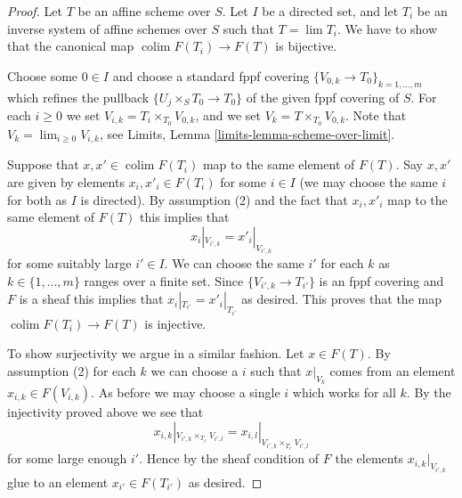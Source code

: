 \documentclass{stacks-project}
\theoremstyle{plain}
\theoremstyle{definition}
\theoremstyle{remark}
\numberwithin{equation}{subsection}
\def\lim{\mathop{\mathrm{lim}}\nolimits}
\def\colim{\mathop{\mathrm{colim}}\nolimits}
\begin{document}
\begin{proof}
Let $T$ be an affine scheme over $S$.
Let $I$ be a directed set, and let
$T_i$ be an inverse system of affine schemes over $S$ such that
$T = \lim T_i$. We have to show that the canonical
map $\colim F(T_i) \to F(T)$ is bijective.

\medskip\noindent
Choose some $0 \in I$ and choose a standard fppf covering
$\{V_{0, k} \to T_{0}\}_{k = 1, \ldots, m}$ which refines
the pullback $\{U_j \times_S T_0 \to T_0\}$ of the given fppf covering of $S$.
For each $i \geq 0$ we set $V_{i, k} = T_i \times_{T_0} V_{0, k}$, and
we set $V_k = T \times_{T_0} V_{0, k}$. Note that
$V_k = \lim_{i \geq 0} V_{i, k}$, see
Limits, Lemma \ref{limits-lemma-scheme-over-limit}.

\medskip\noindent
Suppose that $x, x' \in \colim F(T_i)$ map to the same
element of $F(T)$. Say $x, x'$ are given by elements $x_i, x'_i \in F(T_i)$
for some $i \in I$ (we may choose the same $i$ for both as $I$ is directed).
By assumption (2) and the fact that $x_i, x'_i$ map to the same element
of $F(T)$ this implies that
$$
x_i|_{V_{i', k}} = x'_i|_{V_{i', k}}
$$
for some suitably large $i' \in I$. We can choose the same $i'$ for each
$k$ as $k \in \{1, \ldots, m\}$ ranges over a finite set.
Since $\{V_{i', k} \to T_{i'}\}$
is an fppf covering and $F$ is a sheaf this implies that
$x_i|_{T_{i'}} = x'_i|_{T_{i'}}$ as desired. This proves that the map
$\colim F(T_i) \to F(T)$ is injective.

\medskip\noindent
To show surjectivity we argue in a similar fashion.
Let $x \in F(T)$. By assumption (2) for each $k$ we
can choose a $i$ such that $x|_{V_k}$ comes from an
element $x_{i, k} \in F(V_{i, k})$. As before we may choose a
single $i$ which works for all $k$. By the injectivity
proved above we see that
$$
x_{i, k}|_{V_{i', k} \times_{T_{i'}} V_{i', l}}
=
x_{i, l}|_{V_{i', k} \times_{T_{i'}} V_{i', l}}
$$
for some large enough $i'$. Hence by the sheaf condition of $F$
the elements $x_{i, k}|_{V_{i', k}}$ glue to an element $x_{i'} \in F(T_{i'})$
as desired.
\end{proof}
\end{document}
